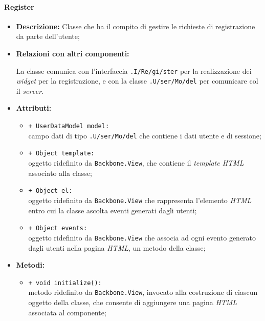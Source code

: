 \paragraph{Register}
\label{register}
\begin{flushleft}
\begin{itemize}
\item \textbf{Descrizione:} Classe che ha il compito di gestire le richieste di registrazione da parte dell'utente;
\item \textbf{Relazioni con altri componenti:}
\begin{sloppypar}
La classe comunica con l'interfaccia \texttt{\viewUser{}.I\fshyp{}Re\fshyp{}gi\fshyp{}ster} per la realizzazione dei \textit{widget} per la registrazione, e con la classe \texttt{\model{}.U\fshyp{}ser\fshyp{}Mo\fshyp{}del} per comunicare col il \textit{server}.
\end{sloppypar}
\item \textbf{Attributi:}
\begin{sloppypar}
\begin{itemize}
\item \texttt{+ UserDataModel model:}\\ campo dati di tipo \texttt{\model{}.U\fshyp{}ser\fshyp{}Mo\fshyp{}del} che contiene i dati utente e di sessione;
\item \texttt{+ Object template:}\\ oggetto ridefinito da \texttt{Backbone.View}, che contiene il \textit{template HTML} associato alla classe;
\item \texttt{+ Object el:}\\ oggetto ridefinito da \texttt{Backbone.View} che rappresenta l'elemento \textit{HTML} entro cui la classe ascolta eventi generati dagli utenti;
\item \texttt{+ Object events:}\\ oggetto ridefinito da \texttt{Backbone.View} che associa ad ogni evento generato dagli utenti nella pagina \textit{HTML}, un metodo della classe;
\end{itemize}
\end{sloppypar}
\item \textbf{Metodi:}
\begin{sloppypar}
\begin{itemize}
\item \texttt{+ void initialize():}\\ metodo ridefinito da \texttt{Backbone.View}, invocato alla costruzione di ciascun oggetto della classe, che consente di aggiungere una pagina \textit{HTML} associata al componente;

\end{itemize}
\end{sloppypar}
\end{itemize}
\end{flushleft}

